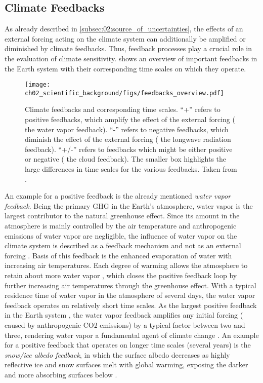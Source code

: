 \subsection{Climate Feedbacks}
\label{subsec:02:climate_feedbacks}

As already described in \cref{subsec:02:source_of_uncertainties}, the effects
of an external forcing acting on the climate system can additionally be
amplified or diminished by climate feedbacks. Thus, feedback processes play a
crucial role in the evaluation of climate sensitivity.
 shows an overview of important feedbacks in
the Earth system with their corresponding time scales on which they operate.

\begin{figure}[t]
  \centering
  \texttt{[image: 
    ch02\_scientific\_background/figs/feedbacks\_overview.pdf]}
  \caption{Climate feedbacks and corresponding time scales. \enquote{+} refers
    to positive feedbacks, which amplify the effect of the external forcing
    (\eg{} the water vapor feedback). \enquote{-} refers to negative feedbacks,
    which diminish the effect of the external forcing (\eg{} the longwave
    radiation feedback). \enquote{+/-} refers to feedbacks which might be
    either positive or negative (\eg{} the cloud feedback). The smaller box
    highlights the large differences in time scales for the various feedbacks.
    Taken from \textcite{Cubasch2013}.}
  \label{fig:02:feedbacks_overview}
\end{figure}

An example for a positive feedback is the already mentioned \emph{water vapor
  feedback}. Being the primary \ac{GHG} in the Earth's atmosphere, water vapor
is the largest contributor to the natural greenhouse effect. Since its amount
in the atmosphere is mainly controlled by the air temperature and anthropogenic
emissions of water vapor are negligible, the influence of water vapor on the
climate system is described as a feedback mechanism and not as an external
forcing \autocite{Myhre2013}. Basis of this feedback is the enhanced
evaporation of water with increasing air temperatures. Each degree of warming
allows the atmosphere to retain about  more water vapor
\autocite{Myhre2013}, which closes the positive feedback loop by further
increasing air temperatures through the greenhouse effect. With a typical
residence time of water vapor in the atmosphere of several days, the water
vapor feedback operates on relatively short time scales. As the largest
positive feedback in the Earth system \autocite{Soden2006}, the water vapor
feedback amplifies any initial forcing (\eg{} caused by anthropogenic \ac{CO2}
emissions) by a typical factor between two and three, rendering water vapor a
fundamental agent of climate change \autocite{Myhre2013}. An example for a
positive feedback that operates on longer time scales (several years) is the
\emph{snow/ice albedo feedback}, in which the surface albedo decreases as
highly reflective ice and snow surfaces melt with global warming, exposing the
darker and more absorbing surfaces below \autocite{Cubasch2013}.

